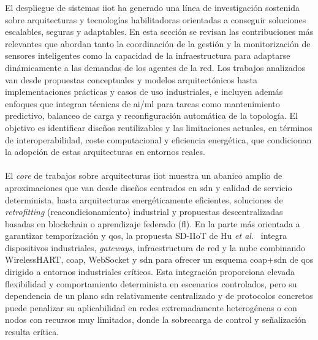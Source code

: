 El despliegue de sistemas \gls{iiot} ha generado una línea de investigación sostenida sobre arquitecturas y tecnologías habilitadoras orientadas a conseguir soluciones escalables, seguras y adaptables. En esta sección se revisan las contribuciones más relevantes que abordan tanto la coordinación de la gestión y la monitorización de sensores inteligentes como la capacidad de la infraestructura para adaptarse dinámicamente a las demandas de los agentes de la red. Los trabajos analizados van desde propuestas conceptuales y modelos arquitectónicos hasta implementaciones prácticas y casos de uso industriales, e incluyen además enfoques que integran técnicas de \gls{ai}/\gls{ml} para tareas como mantenimiento predictivo, balanceo de carga y reconfiguración automática de la topología. El objetivo es identificar diseños reutilizables y las limitaciones actuales, en términos de interoperabilidad, coste computacional y eficiencia energética, que condicionan la adopción de estas arquitecturas en entornos reales.\\
\\
El \textit{core} de trabajos sobre arquitecturas \gls{iiot} muestra un abanico amplio de aproximaciones que van desde diseños centrados en \gls{sdn} y calidad de servicio determinista, hasta arquitecturas energéticamente eficientes, soluciones de \textit{retrofitting} (reacondicionamiento) industrial y propuestas descentralizadas basadas en blockchain o aprendizaje federado (\gls{fl}). En la parte más orientada a garantizar temporización y \gls{qos}, la propuesta SD-IIoT de Hu \textit{et al.}~\cite{hu2015system} integra dispositivos industriales, \textit{gateways}, infraestructura de red y la nube combinando WirelessHART, \gls{coap}, WebSocket y \gls{sdn} para ofrecer un esquema \gls{coap}+\gls{sdn} de \gls{qos} dirigido a entornos industriales críticos. Esta integración proporciona elevada flexibilidad y comportamiento determinista en escenarios controlados, pero su dependencia de un plano \gls{sdn} relativamente centralizado y de protocolos concretos puede penalizar su aplicabilidad en redes extremadamente heterogéneas o con nodos con recursos muy limitados, donde la sobrecarga de control y señalización resulta crítica. \\
\\
